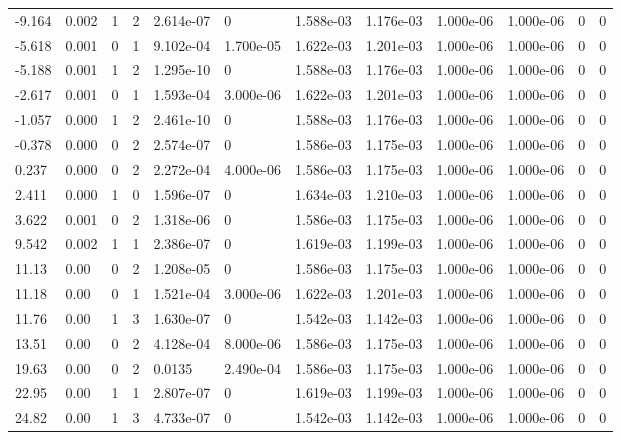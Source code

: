 \documentclass[preview]{standalone}
\begin{document}
{{\begin{tabular}{L{1.2cm}C{1.2cm} C{0.3cm}C{0.5cm} C{1.4cm}C{1.4cm} C{1.4cm}C{1.4cm} C{1.6cm}C{1.6cm} C{1.6cm}C{1.6cm}}
  -9.164  &  0.002  & 1     &  2 &  2.614e-07  & 0  &  1.588e-03&   1.176e-03& 1.000e-06 & 1.000e-06   &  0 & 0  \\ 
  -5.618  &  0.001  & 0     &  1 &  9.102e-04  & 1.700e-05  &  1.622e-03&   1.201e-03& 1.000e-06 & 1.000e-06   &  0 & 0  \\ 
  -5.188  &  0.001  & 1     &  2 &  1.295e-10  & 0  &  1.588e-03&   1.176e-03& 1.000e-06 & 1.000e-06   &  0 & 0  \\ 
  -2.617  &  0.001  & 0     &  1 &  1.593e-04  & 3.000e-06  &  1.622e-03&   1.201e-03& 1.000e-06 & 1.000e-06   &  0 & 0  \\ 
  -1.057  &  0.000  & 1     &  2 &  2.461e-10  & 0  &  1.588e-03&   1.176e-03& 1.000e-06 & 1.000e-06   &  0 & 0  \\ 
  -0.378  &  0.000  & 0     &  2 &  2.574e-07  & 0  &  1.586e-03&   1.175e-03& 1.000e-06 & 1.000e-06   &  0 & 0  \\ 
  0.237  &  0.000  & 0     &  2 &  2.272e-04  & 4.000e-06  &  1.586e-03&   1.175e-03& 1.000e-06 & 1.000e-06   &  0 & 0  \\ 
  2.411  &  0.000  & 1     &  0 &  1.596e-07  & 0  &  1.634e-03&   1.210e-03& 1.000e-06 & 1.000e-06   &  0 & 0  \\ 
  3.622  &  0.001  & 0     &  2 &  1.318e-06  & 0  &  1.586e-03&   1.175e-03& 1.000e-06 & 1.000e-06   &  0 & 0  \\ 
  9.542  &  0.002  & 1     &  1 &  2.386e-07  & 0  &  1.619e-03&   1.199e-03& 1.000e-06 & 1.000e-06   &  0 & 0  \\ 
  11.13  &  0.00  & 0     &  2 &  1.208e-05  & 0  &  1.586e-03&   1.175e-03& 1.000e-06 & 1.000e-06   &  0 & 0  \\ 
  11.18  &  0.00  & 0     &  1 &  1.521e-04  & 3.000e-06  &  1.622e-03&   1.201e-03& 1.000e-06 & 1.000e-06   &  0 & 0  \\ 
  11.76  &  0.00  & 1     &  3 &  1.630e-07  & 0  &  1.542e-03&   1.142e-03& 1.000e-06 & 1.000e-06   &  0 & 0  \\ 
  13.51  &  0.00  & 0     &  2 &  4.128e-04  & 8.000e-06  &  1.586e-03&   1.175e-03& 1.000e-06 & 1.000e-06   &  0 & 0  \\ 
  19.63  &  0.00  & 0     &  2 &  0.0135  & 2.490e-04  &  1.586e-03&   1.175e-03& 1.000e-06 & 1.000e-06   &  0 & 0  \\ 
  22.95  &  0.00  & 1     &  1 &  2.807e-07  & 0  &  1.619e-03&   1.199e-03& 1.000e-06 & 1.000e-06   &  0 & 0  \\ 
  24.82  &  0.00  & 1     &  3 &  4.733e-07  & 0  &  1.542e-03&   1.142e-03& 1.000e-06 & 1.000e-06   &  0 & 0  \\ 

\end{tabular}}}
\end{document}
